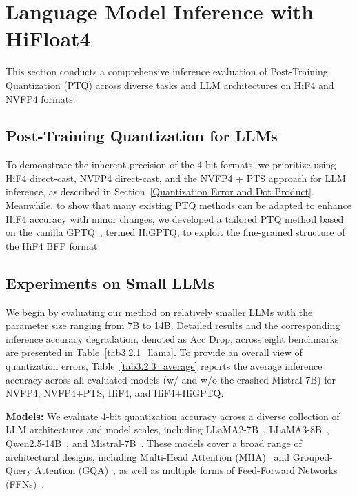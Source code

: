 

\section{Language Model Inference with HiFloat4}

This section conducts a comprehensive inference evaluation of 
Post-Training Quantization (PTQ) across diverse tasks and LLM 
architectures on HiF4 and NVFP4 formats.  

\subsection{Post-Training Quantization for LLMs}

To demonstrate the inherent precision of the 4-bit formats, 
we prioritize using HiF4 direct-cast, NVFP4 direct-cast, 
and the NVFP4 + PTS approach for LLM inference, as described 
in Section~\ref{Quantization Error and Dot Product}. 
Meanwhile, to show that many existing PTQ methods can be 
adapted to enhance HiF4 accuracy with minor changes, 
we developed a tailored PTQ method based on the vanilla 
GPTQ~\cite{Frantar2023}, termed HiGPTQ, 
to exploit the fine-grained structure of the HiF4 BFP format. 

\subsection{Experiments on Small LLMs}
We begin by evaluating our method on relatively smaller LLMs 
with the parameter size ranging from 7B to 14B. 
Detailed results and the corresponding inference accuracy degradation, 
denoted as Acc Drop, across eight benchmarks are presented in 
Table~\ref{tab3.2.1_llama}. 
To provide an overall view of quantization errors, 
Table~\ref{tab3.2.3_average} reports the average inference accuracy 
across all evaluated models (w/ and w/o the crashed Mistral-7B) for 
NVFP4, NVFP4+PTS, HiF4, and HiF4+HiGPTQ. 

\noindent\textbf{Models:} 
We evaluate 4-bit quantization accuracy across a diverse 
collection of LLM architectures and model scales, 
including LLaMA2-7B~\cite{Touvron2023}, 
LLaMA3-8B~\cite{Dubey2024}, 
Qwen2.5-14B~\cite{Qwen2025}, 
and Mistral-7B~\cite{Jiang2023}. 
These models cover a broad range of architectural designs, 
including Multi-Head Attention (MHA)~\cite{Vaswani2017} 
and Grouped-Query Attention (GQA)~\cite{Ainslie2023}, 
as well as multiple forms of Feed-Forward Networks 
(FFNs)~\cite{Shazeer2020}. 


